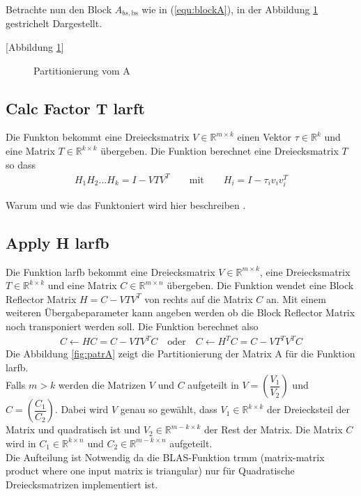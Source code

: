 Betrachte nun den Block $A_{bs, \text{bs}}$ wie in (\ref{equ:blockA}), in der Abbildung \ref{fig:blockA} gestrichelt Dargestellt.

[Abbildung \ref{fig:blockA}]
\begin{figure}
	\centering
	
	\caption{Partitionierung vom A}
	\label{fig:blockA}
\end{figure}

\subsection{Calc Factor T larft}

Die Funkton bekommt eine Dreiecksmatrix $V \in \mathbb{R}^{m \times k}$ einen Vektor $\tau \in \mathbb{R}^k$ und eine Matrix $T\in \mathbb{R}^{k\times k}$ übergeben. 
Die Funktion berechnet eine Dreiecksmatrix $T$ so dass
\begin{align*}
	H_1H_2...H_k = I - VTV^T \qquad \text{mit}\qquad H_i = I - \tau_i v_iv_i^T
\end{align*}

Warum und wie das Funktoniert wird hier beschreiben \cite{Joffrain:2006:AHT:1141885.1141886}.




\subsection{Apply H larfb}

Die Funktion larfb bekommt eine Dreiecksmatrix $V \in \mathbb{R}^{m \times k}$, eine Dreiecksmatrix $T \in \mathbb{R}^{k \times k}$ und eine Matrix $C \in \mathbb{R}^{m \times n }$ übergeben.
Die Funktion wendet eine  Block Reflector Matrix $ 	H = C - V T V^T $ von rechts auf die Matrix $ C $ an. 
Mit einem weiteren Übergabeparameter kann angeben werden ob die Block Reflector Matrix noch transponiert werden soll.
Die Funktion berechnet also
\begin{align*}
	C \leftarrow H C = C - V T V^T C \quad \text{oder} \quad 	C \leftarrow H^T C = C - V T^T V^T C
\end{align*}
Die Abbildung \ref{fig:patrA} zeigt die Partitionierung der Matrix A für die Funktion larfb.\\
Falls $m > k $ werden die Matrizen $V$ und $C$ aufgeteilt in $V=\left(\dfrac{V_1}{V_2}\right)$ und $C=\left(\dfrac{C_1}{C_2}\right)$. Dabei wird $V$ genau so gewählt, dass $V_1 \in \mathbb{R}^{k\times k}$ der Dreiecksteil der Matrix und quadratisch ist und $V_2 \in \mathbb{R}^{m-k\times k}$ der Rest der Matrix. Die Matrix $C$ wird in $C_1 \in \mathbb{R}^{k \times n}$ und $C_2 \in \mathbb{R}^{m-k \times n}$  aufgeteilt.\\
Die Aufteilung ist Notwendig da die BLAS-Funktion trmm (matrix-matrix product where one input matrix is triangular) nur für Quadratische Dreiecksmatrizen implementiert ist.

